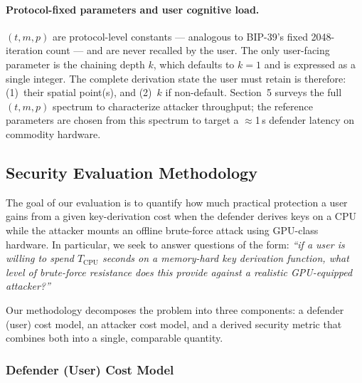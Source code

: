 \documentclass[journal,article,submit,pdftex,moreauthors]{Definitions/mdpi}
\newcommand{\add}[1]{#1}
\newcommand{\add}[1]{\added{#1}}
\begin{document}
\paragraph{\add{Protocol-fixed parameters and user cognitive load.}} \add{$(t, m, p)$ are protocol-level constants — analogous to BIP-39's fixed 2048-iteration count — and are never recalled by the user. The only user-facing parameter is the chaining depth $k$, which defaults to $k=1$ and is expressed as a single integer. The complete derivation state the user must retain is therefore: (1)~their spatial point(s), and (2)~$k$ if non-default. Section~5 surveys the full $(t, m, p)$ spectrum to characterize attacker throughput; the reference parameters are chosen from this spectrum to target a $\approx$1\,s defender latency on commodity hardware.}


\subsection{Security Evaluation Methodology}
\label{sec:security_evaluation}

The goal of our evaluation is to quantify how much practical protection a user gains from a given key-derivation cost when the defender derives keys on a CPU while the attacker mounts an offline brute-force attack using GPU-class hardware. In particular, we seek to answer questions of the form: \emph{``if a user is willing to spend $T_{\text{CPU}}$ seconds on a memory-hard key derivation function, what level of brute-force resistance does this provide against a realistic GPU-equipped attacker?''}

Our methodology decomposes the problem into three components: a defender (user) cost model, an attacker cost model, and a derived security metric that combines both into a single, comparable quantity.

\subsubsection{Defender (User) Cost Model}
\end{document}

